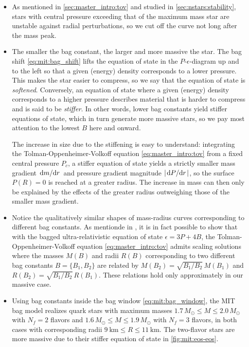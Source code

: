 \begin{itemize}
\item As mentioned in \cref{sec:master_intro:tov} and studied in \cref{sec:nstars:stability},
      stars with central pressure exceeding that of the maximum mass star are unstable against radial perturbations,
      so we cut off the curve not long after the mass peak.
\item The smaller the bag constant, the larger and more massive the star.
      The bag shift \eqref{eq:mit:bag_shift} lifts the equation of state in the $P$-$\epsilon$-diagram up and to the left
      so that a given (energy) density corresponds to a lower pressure.
      This makes the star easier to compress, so we say that the equation of state is \emph{softened}.
      Conversely, an equation of state where a given (energy) density corresponds to a higher pressure
      describes material that is harder to compress and is said to be \emph{stiffer}.
      In other words, lower bag constants yield stiffer equations of state,
      which in turn generate more massive stars,
      so we pay most attention to the lowest $B$ here and onward.

      The increase in size due to the stiffening is easy to understand:
      integrating the Tolman-Oppenheimer-Volkoff equation \eqref{eq:master_intro:tov} from a fixed central pressure $P_c$,
      a stiffer equation of state yields a strictly smaller mass gradient $\odv{m}/{r}$ and pressure gradient magnitude $\abs{\odv{P}/{r}}$,
      so the surface $P(R)=0$ is reached at a greater radius.
      The increase in mass can then only be explained by the effects of the greater radius outweighing those of the smaller mass gradient.
\item Notice the qualitatively similar shapes of mass-radius curves corresponding to different bag constants.
      As mentionde in \cite[equation 8.29]{ref:glendenning},
      it is in fact possible to show that with the bagged ultra-relativistic equation of state $\epsilon = 3P + 4B$,
      the Tolman-Oppenheimer-Volkoff equation \eqref{eq:master_intro:tov} admits scaling solutions
      where the masses $M(B)$ and radii $R(B)$ corresponding to two different bag constants $B=\{B_1,B_2\}$
      are related by $M(B_2) = \sqrt{B_1/B_2} \, M(B_1)$ and $R(B_2) = \sqrt{B_1/B_2} \, R(B_1)$.
      These relations hold only approximately in our massive case.
\item Using bag constants inside the bag window \eqref{eq:mit:bag_window},
      the MIT bag model realizes quark stars with maximum masses
      $1.7 \, M_\odot \leq M \leq 2.0 \, M_\odot$ with $N_f=2$ flavors
      and $1.6 \, M_\odot \leq M \leq 1.9 \, M_\odot$ with $N_f=3$ flavors,
      in both cases with corresponding radii $\SI{9}{\kilo\meter} \leq R \leq \SI{11}{\kilo\meter}$.
      The two-flavor stars are more massive due to their stiffer equation of state in \cref{fig:mit:eos-eos}.
\end{itemize}

